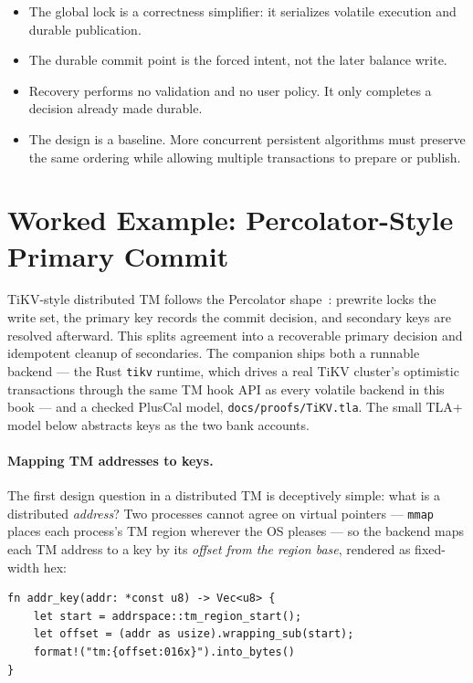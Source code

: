 \begin{itemize}
    \item The global lock is a correctness simplifier: it serializes volatile execution and durable publication.
    \item The durable commit point is the forced intent, not the later balance write.
    \item Recovery performs no validation and no user policy. It only completes a decision already made durable.
    \item The design is a baseline. More concurrent persistent algorithms must preserve the same ordering while allowing multiple transactions to prepare or publish.
\end{itemize}

\section{Worked Example: Percolator-Style Primary Commit}
\label{sec:percolator-commit-example}

TiKV-style distributed TM follows the Percolator shape~\cite{peng10percolator}:
prewrite locks the write set, the primary key records the commit decision, and
secondary keys are resolved afterward. This splits agreement into a recoverable
primary decision and idempotent cleanup of secondaries. The companion ships
both a runnable backend --- the Rust \texttt{tikv} runtime, which drives a real
TiKV cluster's optimistic transactions through the same TM hook API as every
volatile backend in this book --- and a checked PlusCal model,
\texttt{docs/proofs/TiKV.tla}. The small TLA+ model below abstracts keys as the
two bank accounts.

\paragraph{Mapping TM addresses to keys.}
The first design question in a distributed TM is deceptively simple: what is a
distributed \emph{address}? Two processes cannot agree on virtual pointers ---
\texttt{mmap} places each process's TM region wherever the OS pleases --- so
the backend maps each TM address to a key by its \emph{offset from the region
base}, rendered as fixed-width hex:

\begin{lstlisting}[caption={The address-to-key mapping of the companion's TiKV backend: region offsets, not pointers, so independent processes agree on keys.}]
fn addr_key(addr: *const u8) -> Vec<u8> {
    let start = addrspace::tm_region_start();
    let offset = (addr as usize).wrapping_sub(start);
    format!("tm:{offset:016x}").into_bytes()
}
\end{lstlisting}

